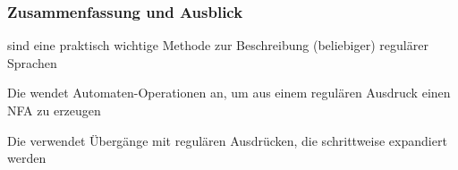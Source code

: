 \documentclass[onlymath]{beamer}
\begin{document}
\begin{frame}\frametitle{Zusammenfassung und Ausblick}

 sind eine praktisch wichtige Methode zur Beschreibung (beliebiger) regulärer Sprachen
\bigskip

Die  wendet Automaten-Operationen an, um aus einem regulären Ausdruck einen
NFA zu erzeugen
\bigskip

Die  verwendet Übergänge mit regulären Ausdrücken, die schrittweise expandiert werden
\bigskip


\end{frame}
\end{document}
